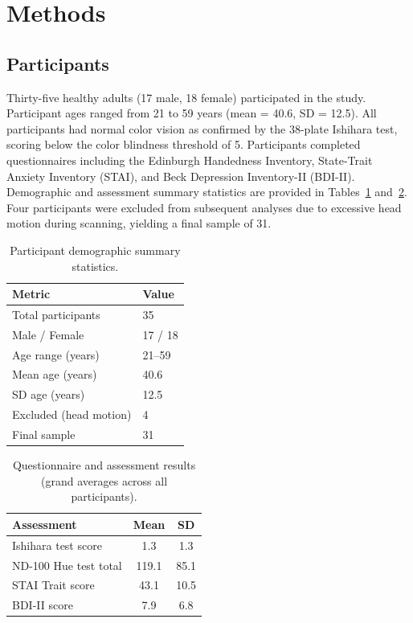 \documentclass[11pt]{article}
\begin{document}
\section{Methods}

\subsection{Participants}

Thirty-five healthy adults (17 male, 18 female) participated in the study. Participant ages ranged from 21 to 59 years (mean = 40.6, SD = 12.5). All participants had normal color vision as confirmed by the 38-plate Ishihara test, scoring below the color blindness threshold of 5. Participants completed questionnaires including the Edinburgh Handedness Inventory, State-Trait Anxiety Inventory (STAI), and Beck Depression Inventory-II (BDI-II). Demographic and assessment summary statistics are provided in Tables~\ref{tab:demographics} and~\ref{tab:assessments}. Four participants were excluded from subsequent analyses due to excessive head motion during scanning, yielding a final sample of 31.

\begin{table}[htbp]
\centering
\caption{Participant demographic summary statistics.}
\label{tab:demographics}
\begin{tabular}{ll}
\toprule
Metric & Value \\
\midrule
Total participants & 35 \\
Male / Female & 17 / 18 \\
Age range (years) & 21--59 \\
Mean age (years) & 40.6 \\
SD age (years) & 12.5 \\
Excluded (head motion) & 4 \\
Final sample & 31 \\
\bottomrule
\end{tabular}
\end{table}

\begin{table}[htbp]
\centering
\caption{Questionnaire and assessment results (grand averages across all participants).}
\label{tab:assessments}
\begin{tabular}{lcc}
\toprule
Assessment & Mean & SD \\
\midrule
Ishihara test score & 1.3 & 1.3 \\
ND-100 Hue test total & 119.1 & 85.1 \\
STAI Trait score & 43.1 & 10.5 \\
BDI-II score & 7.9 & 6.8 \\
\bottomrule
\end{tabular}
\end{table}
\end{document}
